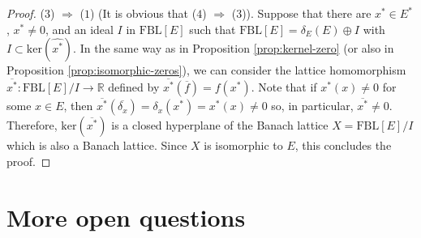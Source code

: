\documentclass[11pt]{amsart}
\theoremstyle{definition}
\numberwithin{equation}{section}
\newcommand{\fbl}{\text{FBL}}
\begin{document}
\begin{proof}
\noindent ($3$) $\Rightarrow$ ($1$)  (It is obvious that ($4$) $\Rightarrow$ ($3$)). Suppose that there are $x^*\in E^*$, $x^*\neq 0$, and an ideal $I$ in $\fbl[E]$ such that $\fbl[E]=\delta_E(E)\oplus I$ with $I\subset \text{ker}(\widehat{x^*})$. In the same way as in Proposition \ref{prop:kernel-zero} (or also in Proposition \ref{prop:isomorphic-zeros}), we can consider the lattice homomorphism $\overline{x^*}:\fbl[E]/I\to \mathbb{R}$ defined by $\overline{x^*}(\overline{f})=f(x^*)$. Note that if $x^*(x)\neq 0$ for some $x\in E$, then $\overline{x^*}(\overline{\delta_x})=\delta_x(x^*)=x^*(x)\neq 0$ so, in particular, $\overline{x^*}\neq 0$. Therefore, $\text{ker}(\overline{x^*})$ is a closed hyperplane of the Banach lattice $X=\fbl[E]/I$ which is also a Banach lattice. Since $X$ is isomorphic to $E$, this concludes the proof.
\end{proof}









\section{More open questions}\label{sec:more questions}
\end{document}
